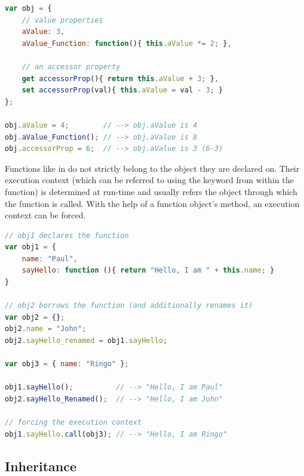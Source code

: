 \SingleSpacing
\begin{lstlisting}[language=JavaScript, caption=Properties in \myProperName{JavaScript}, label=JSTypes]
var obj = {
	// value properties
	aValue: 3,
	aValue_Function: function(){ this.aValue *= 2; },
	
	// an accessor property
	get accessorProp(){ return this.aValue + 3; },
	set accessorProp(val){ this.aValue = val - 3; }
};

obj.aValue = 4;        // --> obj.aValue is 4
obj.aValue_Function(); // --> obj.aValue is 8
obj.accessorProp = 6;  // --> obj.aValue is 3 (6-3)
\end{lstlisting}
\OnehalfSpacing

Functions like  in  do not strictly belong to the object they are declared on. Their execution context (which can be referred to using the  keyword from within the function) is determined at run-time and usually refers the object through which the function is called. With the help of a function object's  method, an execution context can be forced.

\SingleSpacing
\begin{lstlisting}[language=JavaScript, caption=Execution context of functions]
// obj1 declares the function
var obj1 = {
	name: "Paul",
	sayHello: function (){ return "Hello, I am " + this.name; }
}

// obj2 borrows the function (and additionally renames it)
var obj2 = {};
obj2.name = "John";
obj2.sayHello_renamed = obj1.sayHello; 

var obj3 = { name: "Ringo" };

obj1.sayHello();          // --> "Hello, I am Paul"
obj2.sayHello_Renamed();  // --> "Hello, I am John"

// forcing the execution context
obj1.sayHello.call(obj3); // --> "Hello, I am Ringo"

\end{lstlisting}
\OnehalfSpacing

\subsection{Inheritance}
\label{sec:JSInheritance}

